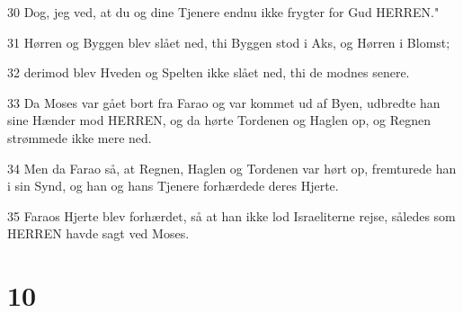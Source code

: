\par 30 Dog, jeg ved, at du og dine Tjenere endnu ikke frygter for Gud HERREN."
\par 31 Hørren og Byggen blev slået ned, thi Byggen stod i Aks, og Hørren i Blomst;
\par 32 derimod blev Hveden og Spelten ikke slået ned, thi de modnes senere.
\par 33 Da Moses var gået bort fra Farao og var kommet ud af Byen, udbredte han sine Hænder mod HERREN, og da hørte Tordenen og Haglen op, og Regnen strømmede ikke mere ned.
\par 34 Men da Farao så, at Regnen, Haglen og Tordenen var hørt op, fremturede han i sin Synd, og han og hans Tjenere forhærdede deres Hjerte.
\par 35 Faraos Hjerte blev forhærdet, så at han ikke lod Israeliterne rejse, således som HERREN havde sagt ved Moses.

\chapter{10}

